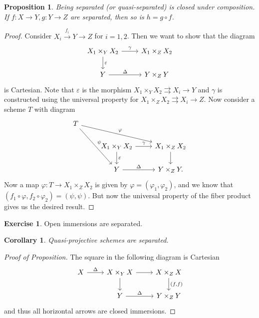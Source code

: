 \documentclass[leqno, openany]{memoir}
\newtheorem{cor}[thm]{Corollary}
\newtheorem{prop}[thm]{Proposition}
\theoremstyle{definition}
\newtheorem{exer}[thm]{Exercise}
\theoremstyle{remark}
\theoremstyle{plain}
\theoremstyle{definition}
\theoremstyle{remark}
\newcommand{\ep}{\varepsilon}
\begin{document}
\begin{prop}
    Being separated (or quasi-separated) is closed under composition. If $f \colon X \to Y, g \colon Y \to Z$ are separated, then so is $h = g \circ f$. 
\end{prop}

\begin{proof}
    Consider $X_i \xrightarrow{f_i} Y \to Z$ for $i = 1,2$. Then we want to show that the diagram
    \begin{equation*}
    \begin{tikzcd}
        X_1 \times_Y X_2 \ar{d}{\ep} \ar{r}{\gamma} & X_1 \times_Z X_2 \\
        Y \ar{r}{\Delta} & Y \times_Z Y
    \end{tikzcd}
    \end{equation*}
    is Cartesian. Note that $\ep$ is the morphism $X_1 \times_Y X_2 \rightrightarrows X_i \to Y$ and $\gamma$ is constructed using the universal property for $X_1 \times_Z X_2 \rightrightarrows X_i \to Z$. Now consider a scheme $T$ with diagram
    \begin{equation*}
    \begin{tikzcd}
        T \ar{drr}{\varphi} \ar{ddr}{\psi} \\
        & X_1 \times_Y X_2 \ar{r}{\gamma} \ar{d}{\ep} & X_1 \times_Z X_2 \ar{d} \\
        & Y \ar{r}{\Delta} & Y \times_Z Y.
    \end{tikzcd}
    \end{equation*}
    Now a map $\varphi \colon T \to X_1 \times_Z X_2$ is given by $\varphi = (\varphi_1, \varphi_2)$, and we know that $( f_1 \circ \varphi, f_2 \circ \varphi_2 ) = (\psi, \psi)$. But now the universal property of the fiber product gives us the desired result.
\end{proof}

\begin{exer}
    Open immersions are separated.
\end{exer}

\begin{cor}
    Quasi-projective schemes are separated. 
\end{cor}

\begin{proof}[Proof of Proposition]
    The square in the following diagram is Cartesian
    \begin{equation*}
    \begin{tikzcd}
        X \ar{r}{\Delta} & X \times_Y X \ar{d} \ar{r} & X \times_Z X \ar{d}{(f,f)} \\
         & Y \ar{r}{\Delta} & Y \times_Z Y
    \end{tikzcd}
    \end{equation*}
    and thus all horizontal arrows are closed immersions.
\end{proof}
\end{document}
